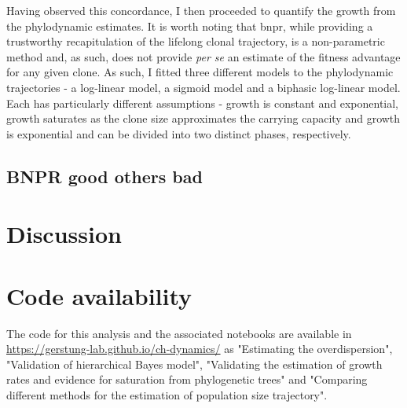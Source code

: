 \begin{figure}[h]
	\label{fig:wf-vs-bnpr-traj}
\end{figure}

Having observed this concordance, I then proceeded to quantify the growth from the phylodynamic estimates. It is worth noting that \ac{bnpr}, while providing a trustworthy recapitulation of the lifelong clonal trajectory, is a non-parametric method and, as such, does not provide \textit{per se} an estimate of the fitness advantage for any given clone. As such, I fitted three different models to the phylodynamic trajectories - a log-linear model, a sigmoid model and a biphasic log-linear model. Each has particularly different assumptions - growth is constant and exponential, growth saturates as the clone size approximates the carrying capacity and growth is exponential and can be divided into two distinct phases, respectively.

\FloatBarrier

\subsection{BNPR good others bad}

\FloatBarrier

\section{Discussion}

\section{Code availability}

The code for this analysis and the associated notebooks are available in \url{https://gerstung-lab.github.io/ch-dynamics/} as "Estimating the overdispersion", "Validation of hierarchical Bayes model", "Validating the estimation of growth rates and evidence for saturation from phylogenetic trees" and "Comparing different methods for the estimation of population size trajectory".